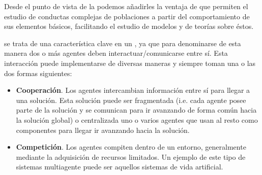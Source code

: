Desde el punto de vista de la  podemos añadirles la ventaja de que permiten el estudio de conductas complejas de poblaciones a partir del comportamiento de sus elementos básicos, facilitando el estudio de modelos y de teorías sobre éstos.

 se trata de una característica clave en un , ya que para denominarse de esta manera dos o más agentes deben interactuar/comunicarse entre sí. Esta interacción puede implementarse de diversas maneras y siempre toman una o las dos formas siguientes:

\begin{itemize}
	\item \textbf{Cooperación}. Los agentes intercambian información entre sí para llegar a una solución. Esta solución puede ser fragmentada (i.e. cada agente posee parte de la solución y se comunican para ir avanzando de forma común hacia la solución global) o centralizada uno o varios agentes que usan al resto como componentes para llegar ir avanzando hacia la solución.
	\item \textbf{Competición}. Los agentes compiten dentro de un entorno, generalmente mediante la adquisición de recursos limitados. Un ejemplo de este tipo de sistemas multiagente puede ser aquellos sistemas de vida artificial.
\end{itemize}
